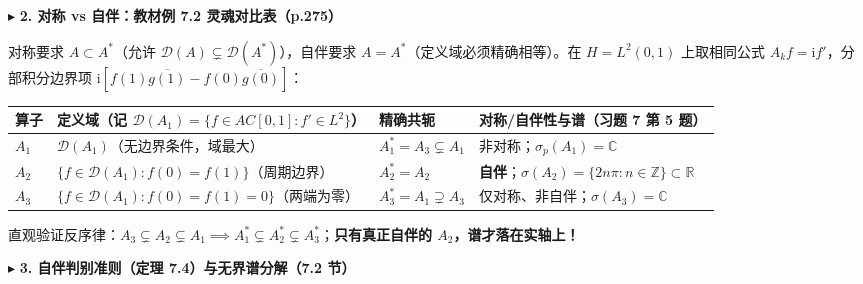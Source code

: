 \documentclass[11pt,a4paper]{article}
\newcounter{none}
\newcommand{\SubSubHeading}[1]{%
  \Needspace{6.5\baselineskip}\vspace{5.5pt}\noindent
  \textcolor{AccentMain}{\scriptsize$\blacktriangleright$}\hspace{4pt}%
  {\small\bfseries\color{AccentMain}#1}\par\nopagebreak[4]\vspace{2.5pt}%
}
\begin{document}
\SubSubHeading{2. 对称 vs 自伴：教材例 7.2 灵魂对比表（p.275）}

对称要求 \(A\subset A^*\)（允许 \(\mathcal{D}(A)\subsetneq\mathcal{D}(A^*)\)），自伴要求 \(A=A^*\)（定义域必须精确相等）。在 \(H=L^2(0,1)\) 上取相同公式 \(A_k f=\mathrm{i}f'\)，分部积分边界项 \(\mathrm{i}[f(1)\overline{g(1)}-f(0)\overline{g(0)}]\)：

{\def\LTcaptype{none} %
{\small\renewcommand{\arraystretch}{1.38}\setlength{\tabcolsep}{5pt}
\begin{longtable}[]{@{}
  >{\centering\arraybackslash}p{}
  >{\raggedright\arraybackslash}p{}
  >{\centering\arraybackslash}p{}
  >{\raggedright\arraybackslash}p{}@{}}
\toprule\noalign{}
\rowcolor{AccentSoft}
\begin{minipage}[b]{\linewidth}\centering
算子
\end{minipage} & \begin{minipage}[b]{\linewidth}\raggedright
定义域（记 \(\mathcal{D}(A_1)=\{f\in AC[0,1]:f'\in L^2\}\)）
\end{minipage} & \begin{minipage}[b]{\linewidth}\centering
精确共轭
\end{minipage} & \begin{minipage}[b]{\linewidth}\raggedright
对称/自伴性与谱（习题 7 第 5 题）
\end{minipage} \\
\midrule\noalign{}
\endhead
\bottomrule\noalign{}
\endlastfoot
\textbf{\(A_1\)} & \(\mathcal{D}(A_1)\)（无边界条件，域最大） & \(A_1^*=A_3\subsetneq A_1\) & 非对称；\(\sigma_p(A_1)=\mathbb{C}\) \\
\textbf{\(A_2\)} & \(\{f\in\mathcal{D}(A_1):f(0)=f(1)\}\)（周期边界） & \(A_2^*=A_2\) & \textbf{自伴}；\(\sigma(A_2)=\{2n\pi:n\in\mathbb{Z}\}\subset\mathbb{R}\) \\
\textbf{\(A_3\)} & \(\{f\in\mathcal{D}(A_1):f(0)=f(1)=0\}\)（两端为零） & \(A_3^*=A_1\supsetneq A_3\) & 仅对称、非自伴；\(\sigma(A_3)=\mathbb{C}\) \\
\end{longtable}
}
}

直观验证反序律：\(A_3\subsetneq A_2\subsetneq A_1 \implies A_1^*\subsetneq A_2^*\subsetneq A_3^*\)；\textbf{只有真正自伴的 \(A_2\)，谱才落在实轴上！}

\SubSubHeading{3. 自伴判别准则（定理 7.4）与无界谱分解（7.2 节）}
\end{document}

